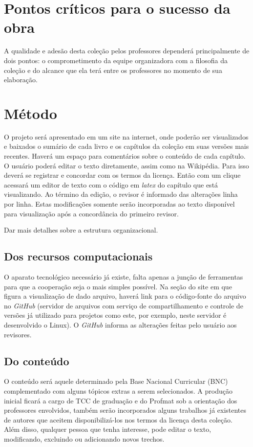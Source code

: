 \documentclass[10 pt]{article}
\begin{document}
\section{Pontos críticos para o sucesso da obra}

A qualidade e adesão desta coleção pelos professores dependerá principalmente de dois pontos: o comprometimento da equipe organizadora com a filosofia da coleção e do alcance que ela terá entre os professores no momento de sua elaboração.

\section{Método}
\label{metodo}

O projeto será apresentado em um site na internet, onde poderão ser visualizados e baixados o sumário de cada livro e os capítulos da coleção em suas versões mais recentes.
Haverá um espaço para comentários sobre o conteúdo de cada capítulo.
O usuário poderá editar o texto diretamente, assim como na Wikipédia.
Para isso deverá se registrar e concordar com os termos da licença.
Então com um clique acessará um editor de texto com o código em {\it latex} do capítulo que está visualizando.
Ao término da edição, o revisor é informado das alterações linha por linha.
Estas modificações somente serão incorporadas ao texto disponível para visualização após a concordância do primeiro revisor.

Dar mais detalhes sobre a estrutura organizacional.

\subsection{Dos recursos computacionais}

O aparato tecnológico necessário já existe, falta apenas a junção de ferramentas para que a cooperação seja o mais simples possível.
Na seção do site em que figura a visualização de dado arquivo, haverá link para o código-fonte do arquivo no {\it GitHub} (servidor de arquivos com serviço de compartilhamento e controle de versões já utilizado para projetos como este, por exemplo, neste servidor é desenvolvido o Linux).
O {\it GitHub} informa as alterações feitas pelo usuário aos revisores.

\subsection{Do conteúdo}

O conteúdo será aquele determinado pela Base Nacional Curricular (BNC) complementado com alguns tópicos extras a serem selecionados.
A produção inicial ficará a cargo de TCC de graduação e do Profmat sob a orientação dos professores envolvidos, também serão incorporados alguns trabalhos já existentes de autores que aceitem disponibilizá-los nos termos da licença desta coleção.
Além disso, qualquer pessoa que tenha interesse, pode editar o texto, modificando, excluindo ou adicionando novos trechos.
\end{document}
